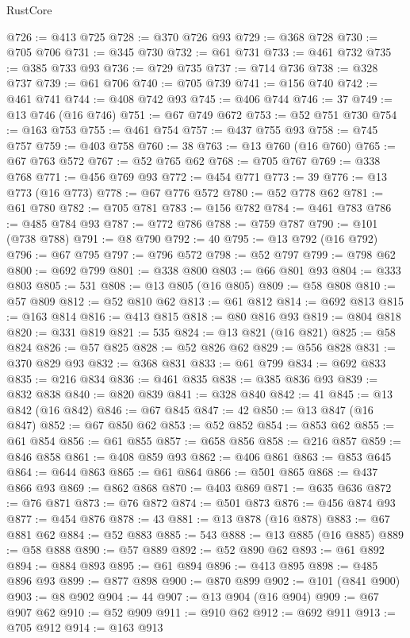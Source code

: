 \begin{lexlean}{RustCore}
\begin{coremodule}
@726 := @413 @725
@728 := @370 @726 @93
@729 := @368 @728
@730 := @705 @706
@731 := @345 @730
@732 := @61 @731
@733 := @461 @732
@735 := @385 @733 @93
@736 := @729 @735
@737 := @714 @736
@738 := @328 @737
@739 := @61 @706
@740 := @705 @739
@741 := @156 @740
@742 := @461 @741
@744 := @408 @742 @93
@745 := @406 @744
@746 := 37
@749 := @13 @746 (@16 @746)
@751 := @67 @749 @672
@753 := @52 @751 @730
@754 := @163 @753
@755 := @461 @754
@757 := @437 @755 @93
@758 := @745 @757
@759 := @403 @758
@760 := 38
@763 := @13 @760 (@16 @760)
@765 := @67 @763 @572
@767 := @52 @765 @62
@768 := @705 @767
@769 := @338 @768
@771 := @456 @769 @93
@772 := @454 @771
@773 := 39
@776 := @13 @773 (@16 @773)
@778 := @67 @776 @572
@780 := @52 @778 @62
@781 := @61 @780
@782 := @705 @781
@783 := @156 @782
@784 := @461 @783
@786 := @485 @784 @93
@787 := @772 @786
@788 := @759 @787
@790 := @101 (@738 @788)
@791 := @8 @790
@792 := 40
@795 := @13 @792 (@16 @792)
@796 := @67 @795
@797 := @796 @572
@798 := @52 @797
@799 := @798 @62
@800 := @692 @799
@801 := @338 @800
@803 := @66 @801 @93
@804 := @333 @803
@805 := 531
@808 := @13 @805 (@16 @805)
@809 := @58 @808
@810 := @57 @809
@812 := @52 @810 @62
@813 := @61 @812
@814 := @692 @813
@815 := @163 @814
@816 := @413 @815
@818 := @80 @816 @93
@819 := @804 @818
@820 := @331 @819
@821 := 535
@824 := @13 @821 (@16 @821)
@825 := @58 @824
@826 := @57 @825
@828 := @52 @826 @62
@829 := @556 @828
@831 := @370 @829 @93
@832 := @368 @831
@833 := @61 @799
@834 := @692 @833
@835 := @216 @834
@836 := @461 @835
@838 := @385 @836 @93
@839 := @832 @838
@840 := @820 @839
@841 := @328 @840
@842 := 41
@845 := @13 @842 (@16 @842)
@846 := @67 @845
@847 := 42
@850 := @13 @847 (@16 @847)
@852 := @67 @850 @62
@853 := @52 @852
@854 := @853 @62
@855 := @61 @854
@856 := @61 @855
@857 := @658 @856
@858 := @216 @857
@859 := @846 @858
@861 := @408 @859 @93
@862 := @406 @861
@863 := @853 @645
@864 := @644 @863
@865 := @61 @864
@866 := @501 @865
@868 := @437 @866 @93
@869 := @862 @868
@870 := @403 @869
@871 := @635 @636
@872 := @76 @871
@873 := @76 @872
@874 := @501 @873
@876 := @456 @874 @93
@877 := @454 @876
@878 := 43
@881 := @13 @878 (@16 @878)
@883 := @67 @881 @62
@884 := @52 @883
@885 := 543
@888 := @13 @885 (@16 @885)
@889 := @58 @888
@890 := @57 @889
@892 := @52 @890 @62
@893 := @61 @892
@894 := @884 @893
@895 := @61 @894
@896 := @413 @895
@898 := @485 @896 @93
@899 := @877 @898
@900 := @870 @899
@902 := @101 (@841 @900)
@903 := @8 @902
@904 := 44
@907 := @13 @904 (@16 @904)
@909 := @67 @907 @62
@910 := @52 @909
@911 := @910 @62
@912 := @692 @911
@913 := @705 @912
@914 := @163 @913

\end{coremodule}
\end{lexlean}
